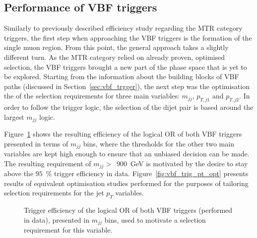 



\subsection{Performance of VBF triggers}
\label{sec:vbf_trigger_performance}

\hspace{10pt} Similarly to previously described efficiency study regarding the MTR category triggers, the first step when approaching the VBF triggers is the formation of the single muon region. From this point, the general approach takes a slightly different turn. As the MTR category relied on already proven, optimised selection, the VBF triggers brought a new part of the phase space that is yet to be explored. Starting from the information about the building blocks of VBF paths (discussed in Section~\ref{sec:vbf_trgger}), the next step was the optimisation the of the selection requirements for three main variables: $m_{jj}$, $p_{T,j1}$ and $p_{T,j2}$. In order to follow the trigger logic, the selection of the dijet pair is based around the largest $m_{jj}$ logic.

\hspace{10pt} Figure~\ref{fig:vbf_trig_mjj_opt} shows the resulting efficiency of the logical OR of both VBF triggers presented in terms of $m_{jj}$ bins, where the thresholds for the other two main variables are kept high enough to ensure that an unbiased decision can be made. The resulting requirement of $m_{jj}>$~900~GeV is motivated by the desire to stay above the $95$~\% trigger efficiency in data. Figure~\ref{fig:vbf_trig_pt_opt} presents results of equivalent optimisation studies performed for the purposes of tailoring selection requirements for the jet $p_T$ variables.

\begin{figure}[htbp]
  \centering
\caption{Trigger efficiency of the logical OR of both VBF triggers (performed in data), presented in $m_{jj}$ bins, used to motivate a selection requirement for this variable.}
\label{fig:vbf_trig_mjj_opt}
\end{figure}

